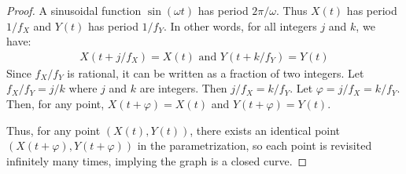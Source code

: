 \documentclass{article}
\theoremstyle{definition}
\renewcommand{\>}{\rangle}
\newcommand{\<}{\langle}
\begin{document}
\begin{proof}
A sinusoidal function $\sin(\omega t)$ has period $2\pi / \omega$. Thus
$X(t)$ has period $1/f_X$ and $Y(t)$ has period $1/f_Y$. In other
words, for all integers $j$ and $k$, we have:
\begin{align*}
X(t + j/f_X) = X(t)\text{ and }Y(t + k/f_Y) = Y(t)
\end{align*}
Since $f_X/f_Y$ is rational, it can be written as a fraction of two integers.
Let $f_X/f_Y = j/k$ where $j$ and $k$ are integers. Then $j/f_X = k/f_Y$.
Let $\varphi = j/f_X = k/f_Y$. Then, for any point,
$X(t+\varphi) = X(t)$ and $Y(t+\varphi) = Y(t)$.

Thus, for any point $(X(t),Y(t))$, there exists an identical point
$(X(t+\varphi),Y(t+\varphi))$ in the parametrization,
so each point is revisited infinitely many times, implying
the graph is a closed curve.
\end{proof}
\end{document}
